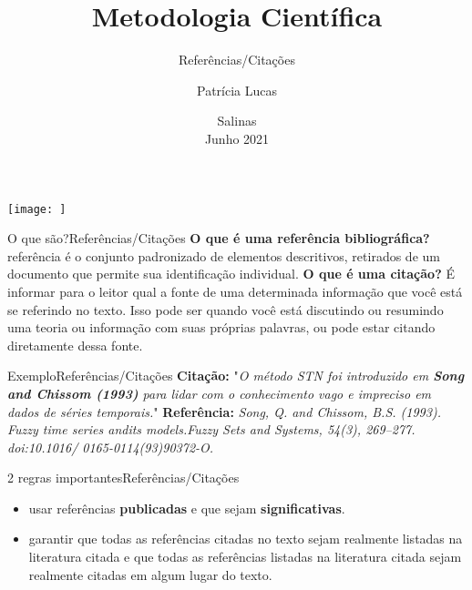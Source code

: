 \documentclass[t]{beamer}
\title[]{Metodologia Científica}
\subtitle[]{Referências/Citações}
\author[]{Patrícia Lucas\\{\footnotesize }}
\institute{Bacharelado em Sistemas de Informação \\ IFNMG  - Campus Salinas}
\date{\scriptsize Salinas\\Junho 2021}
\begin{document}
\begin{frame}

\begin{center}
\texttt{[image: ]}
\end{center}
  \titlepage
\end{frame}



\begin{ftst}{O que são?}{Referências/Citações}
\justifying
\textbf{O que é uma referência bibliográfica?} referência é o conjunto padronizado de elementos descritivos, retirados de um documento que permite sua identificação individual.
\vone
\textbf{O que é uma citação?} É informar para o leitor qual a fonte de uma determinada informação que você está se referindo no texto. Isso pode ser quando você está discutindo ou resumindo uma teoria ou informação com suas próprias palavras, ou pode estar citando diretamente dessa fonte.

\end{ftst}


\begin{ftst}{Exemplo}{Referências/Citações}
\justifying
\vone
\textbf{Citação:} "\textit{O método STN foi introduzido em \textbf{Song and Chissom (1993) }para lidar com o conhecimento vago e impreciso em dados de séries temporais.}"
\vone
\textbf{Referência:} \textit{Song, Q. and Chissom, B.S. (1993). Fuzzy time series andits models.Fuzzy Sets and Systems, 54(3), 269–277. doi:10.1016/
0165-0114(93)90372-O.}


\end{ftst}


\begin{ftst}{2 regras importantes}{Referências/Citações}
\justifying
\vone
\begin{itemize}
    \item[1.] usar referências \textbf{publicadas} e que sejam \textbf{significativas}. 
    \item[2.] garantir que todas as referências citadas no texto sejam realmente listadas na literatura citada e que todas as referências listadas na literatura citada sejam realmente citadas em algum lugar do texto.
\end{itemize}

\end{ftst}
\end{document}
